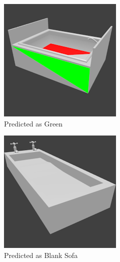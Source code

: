 \begin{figure}
	\begin{subfigure}{.3\textwidth}
		\centering
		\includegraphics[width=.8\textwidth]{images/bathtub_0125_3_004.png}
		\caption{Predicted as Green}
		\label{fig:small-features-d}
	\end{subfigure}
	\begin{subfigure}{.3\textwidth}
		\centering
		\includegraphics[width=.8\textwidth]{images/bathtub_0111_0_011.png}
		\caption{Predicted as Blank Sofa}
		\label{fig:small-features-e}
	\end{subfigure}
	\begin{subfigure}{.3\textwidth}

\end{subfigure}
\end{figure}
